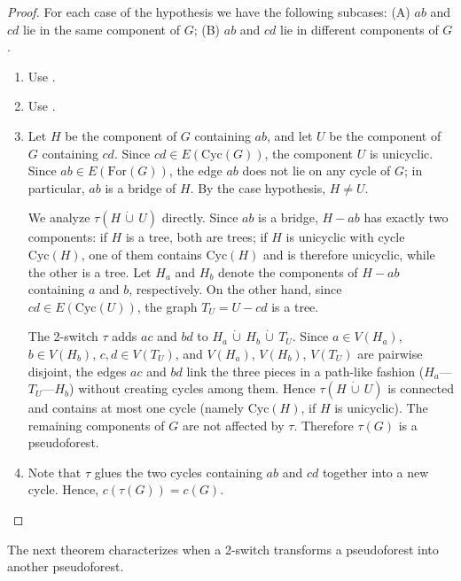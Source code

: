 \documentclass{BICA}
\begin{document}
\begin{proof}
	For each case of the hypothesis we have the following subcases:
	(A) $ab$ and $cd$ lie in the same component of $G$;
	(B) $ab$ and $cd$ lie in different components of $G$.
	\begin{enumerate}
		\item[(1.A)] Use .

		\item[(2.A)] Use .

		\item[(1.B)] Let $H$ be the component of $G$ containing $ab$, and let $U$ be the component of $G$ containing $cd$. Since $cd \in E(\mathrm{Cyc}(G))$, the component $U$ is unicyclic. Since $ab \in E(\mathrm{For}(G))$, the edge $ab$ does not lie on any cycle of $G$; in particular, $ab$ is a bridge of $H$. By the case hypothesis, $H \ne U$.

		We analyze $\tau(H \,\dot\cup\, U)$ directly. Since $ab$ is a bridge, $H - ab$ has exactly two components: if $H$ is a tree, both are trees; if $H$ is unicyclic with cycle $\mathrm{Cyc}(H)$, one of them contains $\mathrm{Cyc}(H)$ and is therefore unicyclic, while the other is a tree. Let $H_a$ and $H_b$ denote the components of $H - ab$ containing $a$ and $b$, respectively. On the other hand, since $cd \in E(\mathrm{Cyc}(U))$, the graph $T_U = U - cd$ is a tree.

		The 2-switch $\tau$ adds $ac$ and $bd$ to $H_a \,\dot\cup\, H_b \,\dot\cup\, T_U$. Since $a \in V(H_a)$, $b \in V(H_b)$, $c, d \in V(T_U)$, and $V(H_a)$, $V(H_b)$, $V(T_U)$ are pairwise disjoint, the edges $ac$ and $bd$ link the three pieces in a path-like fashion ($H_a$---$T_U$---$H_b$) without creating cycles among them. Hence $\tau(H \,\dot\cup\, U)$ is connected and contains at most one cycle (namely $\mathrm{Cyc}(H)$, if $H$ is unicyclic). The remaining components of $G$ are not affected by $\tau$. Therefore $\tau(G)$ is a pseudoforest.

		\item[(2.B)] Note that $\tau$ glues the two cycles containing $ab$ and $cd$ together into a new cycle. Hence, $c(\tau(G)) = c(G)$. \qedhere
	\end{enumerate}
\end{proof}

The next theorem characterizes when a 2-switch transforms a pseudoforest into another pseudoforest.
\end{document}
